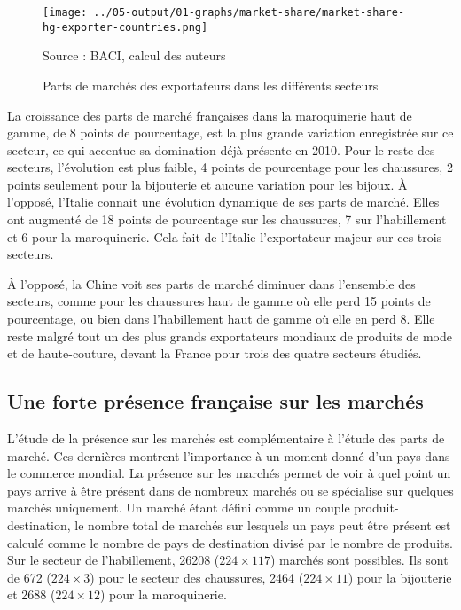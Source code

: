 \documentclass[french,10pt,a4paper]{article}
\begin{document}
\begin{figure}[!h]
  \centering
  \texttt{[image: ../05-output/01-graphs/market-share/market-share-hg-exporter-countries.png]}
  \captionsetup{justification=raggedright,singlelinecheck=false, font=small}
  \caption*{Source : BACI, calcul des auteurs}
  \captionsetup{justification=centering, singlelinecheck=true, font=normalsize}
  \caption{Parts de marchés des exportateurs dans les différents secteurs}
  \label{fig:market-share}
\end{figure}



\bigskip

La croissance des parts de marché françaises dans la maroquinerie haut de gamme, de 8 points de pourcentage, est la plus grande variation enregistrée sur ce secteur, ce qui accentue sa domination déjà présente en 2010. Pour le reste des secteurs, l'évolution est plus faible, 4 points de pourcentage pour les chaussures, 2 points seulement pour la bijouterie et aucune variation pour les bijoux. À l'opposé, l'Italie connait une évolution dynamique de ses parts de marché. Elles ont augmenté de 18 points de pourcentage sur les chaussures, 7 sur l'habillement et 6 pour la maroquinerie. Cela fait de l'Italie l'exportateur majeur sur ces trois secteurs.

À l'opposé, la Chine voit ses parts de marché diminuer dans l'ensemble des secteurs, comme pour les chaussures haut de gamme où elle perd 15 points de pourcentage, ou bien dans l'habillement haut de gamme où elle en perd 8. Elle reste malgré tout un des plus grands exportateurs mondiaux de produits de mode et de haute-couture, devant la France pour trois des quatre secteurs étudiés.

\subsection{Une forte présence française sur les marchés}
L'étude de la présence sur les marchés est complémentaire à l'étude des parts de marché. Ces dernières montrent l'importance à un moment donné d'un pays dans le commerce mondial. La présence sur les marchés permet de voir à quel point un pays arrive à être présent dans de nombreux marchés ou se spécialise sur quelques marchés uniquement. Un marché étant défini comme un couple produit-destination, le nombre total de marchés sur lesquels un pays peut être présent est calculé comme le nombre de pays de destination divisé par le nombre de produits. Sur le secteur de l'habillement, 26208 ($224 \times 117$) marchés sont possibles. Ils sont de 672 ($224 \times 3$) pour le secteur des chaussures, 2464 ($224 \times 11$) pour la bijouterie et 2688 ($224 \times 12$) pour la maroquinerie.
\end{document}
